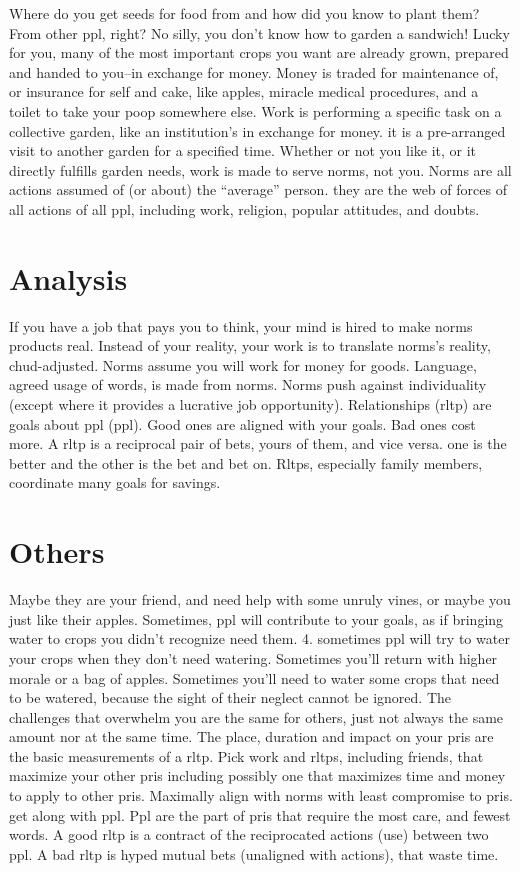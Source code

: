 \documentclass[
]{book}
\begin{document}
Where do you get seeds for food from and how did you know to plant them?
From other ppl, right? No silly, you don't know how to garden a sandwich!
Lucky for you, many of the most important crops you want are already grown, prepared and handed to you--in exchange for money.
Money is traded for maintenance of, or insurance for self and cake, like apples, miracle medical procedures, and a toilet to take your poop somewhere else.
Work is performing a specific task on a collective garden, like an institution's in exchange for money. it is a pre-arranged visit to another garden for a specified time.
Whether or not you like it, or it directly fulfills garden needs, work is made to serve norms, not you.
Norms are all actions assumed of (or about) the ``average'' person. they are the web of forces of all actions of all ppl, including work, religion, popular attitudes, and doubts.

\hypertarget{analysis}{%
\section{Analysis}\label{analysis}}

If you have a job that pays you to think, your mind is hired to make norms products real.
Instead of your reality, your work is to translate norms's reality, chud-adjusted.
Norms assume you will work for money for goods.
Language, agreed usage of words, is made from norms.
Norms push against individuality (except where it provides a lucrative job opportunity).
Relationships (rltp) are goals about ppl (ppl).
Good ones are aligned with your goals.
Bad ones cost more.
A rltp is a reciprocal pair of bets, yours of them, and vice versa. one is the better and the other is the bet and bet on.
Rltps, especially family members, coordinate many goals for savings.

\hypertarget{others}{%
\section{Others}\label{others}}

Maybe they are your friend, and need help with some unruly vines, or maybe you just like their apples.
Sometimes, ppl will contribute to your goals, as if bringing water to crops you didn't recognize need them. 4. sometimes ppl will try to water your crops when they don't need watering.
Sometimes you'll return with higher morale or a bag of apples.
Sometimes you'll need to water some crops that need to be watered, because the sight of their neglect cannot be ignored.
The challenges that overwhelm you are the same for others, just not always the same amount nor at the same time.
The place, duration and impact on your pris are the basic measurements of a rltp.
Pick work and rltps, including friends, that maximize your other pris including possibly one that maximizes time and money to apply to other pris.
Maximally align with norms with least compromise to pris. get along with ppl.
Ppl are the part of pris that require the most care, and fewest words.
A good rltp is a contract of the reciprocated actions (use) between two ppl.
A bad rltp is hyped mutual bets (unaligned with actions), that waste time.
\end{document}
